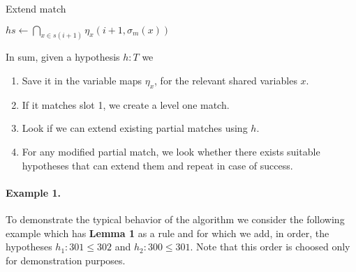 \documentclass[runningheads]{llncs}
\newcommand{\xcom}[1]{{\color{cyan}{Xavier: #1}} }
\begin{document}
\begin{algorithm}
    \caption{Extend match}\label{alg:updatematch}
        $hs \gets \bigcap_{x \in s(i + 1)} \eta_x \left(i + 1, \sigma_m(x)\right)$ \\
\end{algorithm}

In sum, given a hypothesis $h :T$ we
\begin{enumerate}
\item Save it in the variable maps $\eta_x$, for the relevant shared variables $x$.
\item If it matches slot 1, we create a level one match.
\item Look if we can extend existing partial matches using $h$.
\item For any modified partial match, we look whether there exists suitable hypotheses that can extend them and repeat in case of success.
\end{enumerate}



\paragraph{Example 1.}

\xcom{Technically, it is useless to save level 1 hyps in $\eta_x$. Should we remove them from the examples?.}
To demonstrate the typical behavior of the algorithm we consider the following example which has \textbf{Lemma 1} as a rule and for which we add, in order, the hypotheses $h_1 : 301 \leq 302$ and $h_2 : 300 \leq 301$.
Note that this order is choosed only for demonstration purposes.
\end{document}
